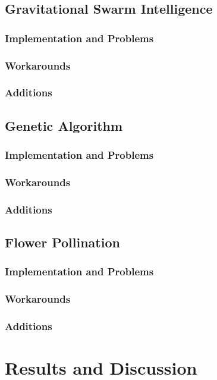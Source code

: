 \documentclass[11pt,a4paper]{report}
\begin{document}
\section{Gravitational Swarm Intelligence}
\subsection{Implementation and Problems}
\subsection{Workarounds}
\subsection{Additions}

\section{Genetic Algorithm}
\subsection{Implementation and Problems}
\subsection{Workarounds}
\subsection{Additions}

\section{Flower Pollination}
\subsection{Implementation and Problems}
\subsection{Workarounds}
\subsection{Additions}


\chapter{Results and Discussion}
\end{document}

